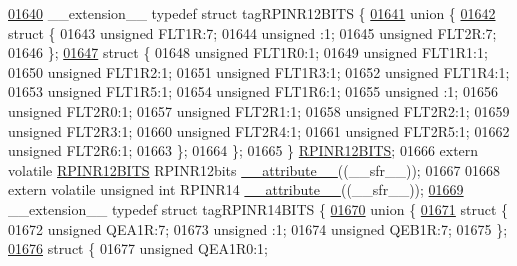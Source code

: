 \begin{DoxyCode}
\hypertarget{a00009_source_l01640}{}\hyperlink{a00008}{01640} \_\_extension\_\_ \textcolor{keyword}{typedef} \textcolor{keyword}{struct }tagRPINR12BITS \{
\hypertarget{a00009_source_l01641}{}\hyperlink{a00009}{01641}   \textcolor{keyword}{union }\{
\hypertarget{a00009_source_l01642}{}\hyperlink{a00009}{01642}     \textcolor{keyword}{struct }\{
01643       \textcolor{keywordtype}{unsigned} FLT1R:7;
01644       \textcolor{keywordtype}{unsigned} :1;
01645       \textcolor{keywordtype}{unsigned} FLT2R:7;
01646     \};
\hypertarget{a00009_source_l01647}{}\hyperlink{a00009}{01647}     \textcolor{keyword}{struct }\{
01648       \textcolor{keywordtype}{unsigned} FLT1R0:1;
01649       \textcolor{keywordtype}{unsigned} FLT1R1:1;
01650       \textcolor{keywordtype}{unsigned} FLT1R2:1;
01651       \textcolor{keywordtype}{unsigned} FLT1R3:1;
01652       \textcolor{keywordtype}{unsigned} FLT1R4:1;
01653       \textcolor{keywordtype}{unsigned} FLT1R5:1;
01654       \textcolor{keywordtype}{unsigned} FLT1R6:1;
01655       \textcolor{keywordtype}{unsigned} :1;
01656       \textcolor{keywordtype}{unsigned} FLT2R0:1;
01657       \textcolor{keywordtype}{unsigned} FLT2R1:1;
01658       \textcolor{keywordtype}{unsigned} FLT2R2:1;
01659       \textcolor{keywordtype}{unsigned} FLT2R3:1;
01660       \textcolor{keywordtype}{unsigned} FLT2R4:1;
01661       \textcolor{keywordtype}{unsigned} FLT2R5:1;
01662       \textcolor{keywordtype}{unsigned} FLT2R6:1;
01663     \};
01664   \};
01665 \} \hyperlink{a00008_da/d3a/a00694}{RPINR12BITS};
01666 \textcolor{keyword}{extern} \textcolor{keyword}{volatile} \hyperlink{a00008_da/d3a/a00694}{RPINR12BITS} RPINR12bits \hyperlink{a00009_a493c46f03454991ccc5aa7a6e1dfb2a7}{\_\_attribute\_\_}((\_\_sfr\_\_));
01667 
01668 \textcolor{keyword}{extern} \textcolor{keyword}{volatile} \textcolor{keywordtype}{unsigned} \textcolor{keywordtype}{int}  RPINR14 \hyperlink{a00009_a493c46f03454991ccc5aa7a6e1dfb2a7}{\_\_attribute\_\_}((\_\_sfr\_\_));
\hypertarget{a00009_source_l01669}{}\hyperlink{a00008}{01669} \_\_extension\_\_ \textcolor{keyword}{typedef} \textcolor{keyword}{struct }tagRPINR14BITS \{
\hypertarget{a00009_source_l01670}{}\hyperlink{a00009}{01670}   \textcolor{keyword}{union }\{
\hypertarget{a00009_source_l01671}{}\hyperlink{a00009}{01671}     \textcolor{keyword}{struct }\{
01672       \textcolor{keywordtype}{unsigned} QEA1R:7;
01673       \textcolor{keywordtype}{unsigned} :1;
01674       \textcolor{keywordtype}{unsigned} QEB1R:7;
01675     \};
\hypertarget{a00009_source_l01676}{}\hyperlink{a00009}{01676}     \textcolor{keyword}{struct }\{
01677       \textcolor{keywordtype}{unsigned} QEA1R0:1;

\end{DoxyCode}
